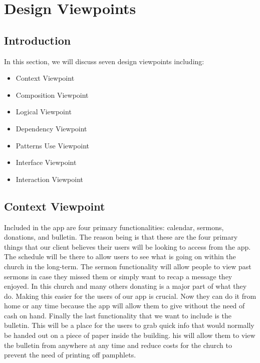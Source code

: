 \documentclass[letterpaper,10pt,draftclsnofoot,onecolumn,titlepage]{IEEEtran}
\begin{document}
	\section{Design Viewpoints}

		\subsection{Introduction}
		In this section, we will discuss seven design viewpoints including:
			\begin{itemize}
				\item{Context Viewpoint}
				\item{Composition Viewpoint}
				\item{Logical Viewpoint}
				\item{Dependency Viewpoint}
				\item{Patterns Use Viewpoint}
				\item{Interface Viewpoint}
				\item{Interaction Viewpoint}
			\end{itemize}

		\subsection{Context Viewpoint}
		Included in the app are four primary functionalities: calendar, sermons, donations, and bulletin.
		The reason being is that these are the four primary things that our client believes their users will be looking to access from the app.
		The schedule will be there to allow users to see what is going on within the church in the long-term.
		The sermon functionality will allow people to view past sermons in case they missed them or simply want to recap a message they enjoyed.
		In this church and many others donating is a major part of what they do.
		Making this easier for the users of our app is crucial.
		Now they can do it from home or any time because the app will allow them to give without the need of cash on hand.
		Finally the last functionality that we want to include is the bulletin.
		This will be a place for the users to grab quick info that would normally be handed out on a piece of paper inside the building.
		his will allow them to view the bulletin from anywhere at any time and reduce costs for the church to prevent the need of printing off pamphlets.
\end{document}
